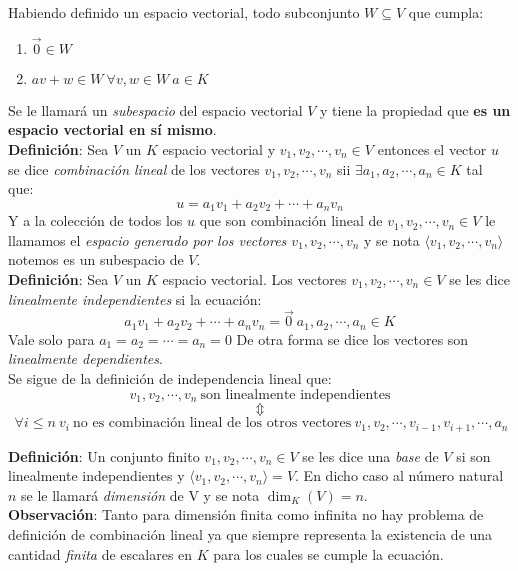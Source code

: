 \documentclass[a4paper,spanish]{article}
\numberwithin{equation}{section}
\begin{document}
Habiendo definido un espacio vectorial, todo subconjunto $W \subseteq V$ que cumpla:
\begin{enumerate}
\item $ \vec{0} \in W $
\item $ av+w \in W \ \forall v,w \in W \ a\in K $
\end{enumerate}

Se le llamar\'a un \textit{subespacio} del espacio vectorial $V$ y tiene la propiedad que \textbf{es un espacio vectorial en s\'i mismo}.\\


\textbf{Definici\'on}: Sea $V$ un $K$ espacio vectorial y $v_1,v_2,\cdots,v_n \in V$ entonces el vector $u$ se dice \textit{combinaci\'on lineal} de los vectores $v_1,v_2,\cdots,v_n $ sii $\exists a_1,a_2,\cdots,a_n \in K$ tal que:
\[u=a_1v_1+a_2v_2+\cdots+a_nv_n\]
Y a la colecci\'on de todos los $u$ que son combinaci\'on lineal de $v_1,v_2,\cdots,v_n \in V$ le llamamos el \textit{espacio generado por los vectores $v_1,v_2,\cdots,v_n$} y se nota $\langle{v_1,v_2,\cdots,v_n}\rangle$ notemos es un subespacio de $V$.\\

\textbf{Definici\'on}: Sea $V$ un $K$ espacio vectorial. Los vectores $v_1,v_2,\cdots,v_n \in V$ se les dice \textit{linealmente independientes} si la ecuaci\'on:
\[a_1v_1+a_2v_2+\cdots+a_nv_n=\vec{0} \ a_1,a_2,\cdots,a_n \in K \]
Vale solo para $a_1=a_2=\cdots=a_n=0$ De otra forma se dice los vectores son \textit{linealmente dependientes}.\\


Se sigue de la definici\'on de independencia lineal que:\\
\[v_1,v_2,\cdots,v_n \ \mbox{son linealmente independientes}\] 
\[\Updownarrow\]
\[\ \forall i\leq n \ v_i \ \mbox{no es combinaci\'on lineal de los otros vectores} \ v_1,v_2,\cdots,v_{i-1},v_{i+1},\cdots,a_n \]

\textbf{Definici\'on}: Un conjunto finito $v_1,v_2,\cdots,v_n \in V$ se les dice una \textit{base} de $V$ si son linealmente independientes y $\langle{v_1,v_2,\cdots,v_n}\rangle = V$. En dicho caso al n\'umero natural $n$ se le llamar\'a \textit{dimensi\'on} de V y se nota $\dim_K{\left(V\right)}=n$.\\
\newline
\textbf{Observaci\'on}: Tanto para dimensi\'on finita como infinita no hay problema de definici\'on de combinaci\'on lineal ya que siempre representa la existencia de una cantidad \textit{finita} de escalares en $K$ para los cuales se cumple la ecuaci\'on.\\
\end{document}
